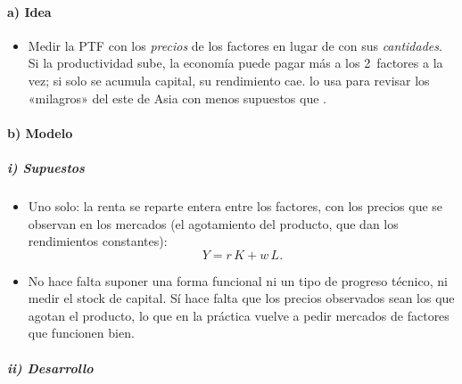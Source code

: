 \documentclass[11pt]{article}
\begin{document}
\paragraph{a) Idea}

\begin{itemize}
\item Medir la PTF con los \emph{precios} de los factores en lugar de con sus \emph{cantidades}. Si la productividad sube, la economía puede pagar más a los 2~factores a la vez; si solo se acumula capital, su rendimiento cae. \textcite{Hsieh2002} lo usa para revisar los «milagros» del este de Asia con menos supuestos que .
\end{itemize}

\paragraph{b) Modelo}

\subparagraph{i) Supuestos}

\begin{itemize}
\item Uno solo: la renta se reparte entera entre los factores, con los precios que se observan en los mercados (el agotamiento del producto, que dan los rendimientos constantes):
  \begin{equation}
  Y=r\,K+w\,L .\label{eq:euler-reparto}
  \end{equation}
\item No hace falta suponer una forma funcional ni un tipo de progreso técnico, ni medir el stock de capital. Sí hace falta que los precios observados sean los que agotan el producto, lo que en la práctica vuelve a pedir mercados de factores que funcionen bien.
\end{itemize}

\subparagraph{ii) Desarrollo}
\end{document}
